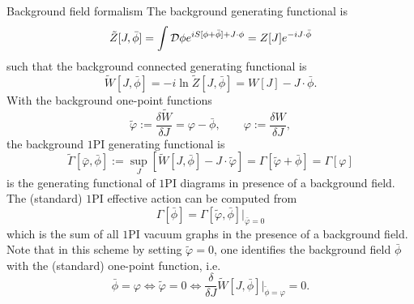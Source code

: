 \begin{mybox}{Background field formalism}
	The background generating functional is
	\begin{equation}
		\tilde{Z}[J,\bar{ \phi}] = \int \mathcal{D} \phi e^{i S[\phi+\bar{ \phi}] + J\cdot \phi} = Z[J] e^{-i J\cdot \bar{ \phi}}  
	\end{equation}
	such that the background connected generating functional is
	\begin{equation}
		\tilde{W}[J,\bar{ \phi}] = -i \ln \tilde{Z}[J,\bar{ \phi}] = W[J] - J\cdot \bar{ \phi}.
	\end{equation}
	With the background one-point functions
	\begin{equation}
		\tilde{\varphi}:= \frac{\delta \tilde{W}}{\delta J} = \varphi - \bar{ \phi},\qquad \varphi := \frac{\delta W}{\delta J},
	\end{equation}
	the background $1$PI generating functional is
	\begin{equation}
		\tilde{\Gamma}[\bar{\varphi},\bar{ \phi}] := \sup_J \left[\tilde{W}[J,\bar{ \phi}]-J\cdot \tilde{\varphi}\right] = \Gamma[\tilde{\varphi}+\bar{ \phi}] = \Gamma[\varphi]
	\end{equation}
	is the generating functional of $1$PI diagrams in presence of a background field. The (standard) $1$PI effective action can be computed from
	\begin{equation}
	\label{eq:1PIeffectiveactionBackground}
		\Gamma[\bar{ \phi}]=\Gamma[\tilde{\varphi},\bar{ \phi}]|_{\bar{\varphi}=0}
	\end{equation}
	which is the sum of all $1$PI vacuum graphs in the presence of a background field.\\
	Note that in this scheme by setting $\tilde{\varphi}=0$, one identifies the background field $\bar{ \phi}$ with the (standard) one-point function, i.e.
	\begin{equation}
		\bar{ \phi} = \varphi \Leftrightarrow \tilde{\varphi}=0 \Leftrightarrow \frac{\delta}{\delta J}\tilde{W}[J,\bar{ \phi}]|_{\tilde{\phi}=\varphi}=0.
	\end{equation}
\end{mybox}
